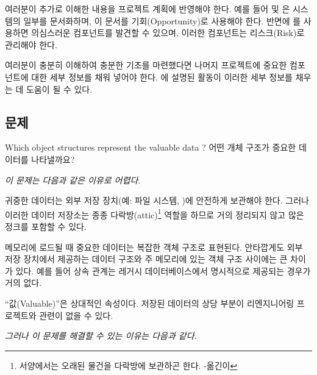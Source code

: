 \documentclass[a4paper,10pt,twoside]{book}
\begin{document}
여러분이 추가로 이해한 내용을 프로젝트 계획에 반영해야 한다. 예를 들어  및 은 시스템의 일부를 문서화하며, 이 문서를 기회(Opportunity)로 사용해야 한다. 반면에 를 사용하면 의심스러운 컴포넌트를 발견할 수 있으며, 이러한 컴포넌트는 리스크(Risk)로 관리해야 한다.

여러분이 충분히 이해하여 충분한 기초를 마련했다면 나머지 프로젝트에 중요한 컴포넌트에 대한 세부 정보를 채워 넣어야 한다. 에 설명된 활동이 이러한 세부 정보를 채우는 데 도움이 될 수 있다.



\subsection*{문제}

Which object structures represent the valuable data ?
어떤 개체 구조가 중요한 데이터를 나타낼까요?

\emph{이 문제는 다음과 같은 이유로 어렵다.}

\begin{bulletlist}
\item 귀중한 데이터는 외부 저장 장치(예: 파일 시스템, )에 안전하게 보관해야 한다. 그러나 이러한 데이터 저장소는 종종 다락방(attic)\footnote{서양에서는 오래된 물건을 다락방에 보관하곤 한다. -옮긴이} 역할을 하므로 거의 정리되지 않고 많은 정크를 포함할 수 있다.

\item 메모리에 로드될 때 중요한 데이터는 복잡한 객체 구조로 표현된다. 안타깝게도 외부 저장 장치에서 제공하는 데이터 구조와 주 메모리에 있는 객체 구조 사이에는 큰 차이가 있다. 예를 들어 상속 관계는 레거시 데이터베이스에서 명시적으로 제공되는 경우가 거의 없다.

\item ``값(Valuable)''은 상대적인 속성이다. 저장된 데이터의 상당 부분이 리엔지니어링 프로젝트와 관련이 없을 수 있다.
\end{bulletlist}

\emph{그러나 이 문제를 해결할 수 있는 이유는 다음과 같다.}
\end{document}
